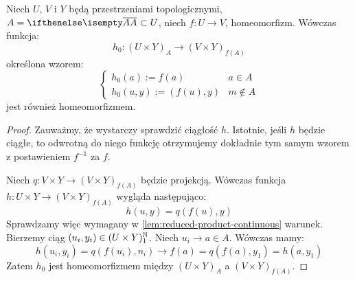 \begin{lem}
  Niech $U$, $V$ i $Y$ będą przestrzeniami topologicznymi, $A = \cl A \subset U$, niech  $f: U \to V$, homeomorfizm. Wówczas funkcja:
  \[
    h_0: (U \times Y)_A \to (V \times Y)_{f(A)}
  \]
  określona wzorem:
  \[
    \begin{cases}
      h_0(a) := f(a)& a\in A \\
      h_0(u,y) := (f(u), y)& m\not\in A
    \end{cases}
  \]
  jest również homeomorfizmem.
  \begin{proof}
    Zauważmy, że wystarczy sprawdzić ciągłość $h$. Istotnie, jeśli $h$ będzie ciągłe, to odwrotną do niego funkcję otrzymujemy dokładnie tym samym wzorem z postawieniem $f^{-1}$ za $f$.

    Niech $q: V\times Y \to (V\times Y)_{f(A)}$ będzie projekcją. Wówczas funkcja $h: U\times Y \to (V\times Y)_{f(A)}$ wygląda następująco:
    \[
      h(u,y) = q(f(u),y)
    \]
    Sprawdzamy więc wymagany w \ref{lem:reduced-product-continuous} warunek. Bierzemy ciąg $(u_i, y_i) \in (U\times Y)^\mathbb{N}_1$. Niech $u_i \to a \in A$. Wówczas mamy:
    \[
      h(u_i,y_i) = q(f(u_i), n_i) \to f(a) = q(f(a),y_1) = h(a,y_1)
    \]
    Zatem $h_0$ jest homeomorfizmem między $(U \times Y)_A$ a $(V \times Y)_{f(A)}$.
  \end{proof}
\end{lem}
